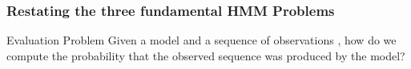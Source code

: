 \begin{frame}[T]
  \frametitle{Restating the three fundamental HMM Problems}
  
  \begin{block}{Evaluation Problem}
    Given a model  and a
    sequence of observations , how do we compute the probability
     that the
    observed sequence was produced by the model? \\
  \end{block}
\end{frame}

